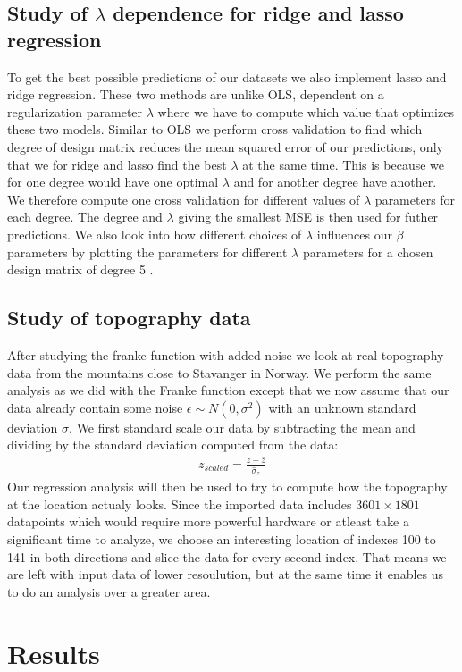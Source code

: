 \documentclass[12pt]{article}
\begin{document}
\subsection{Study of $\lambda$ dependence for ridge and lasso regression}
To get the best possible predictions of our datasets we also implement lasso and ridge regression. These two methods are unlike OLS, dependent on a regularization parameter $\lambda$ where we have to compute which value that optimizes these two models. Similar to OLS we perform cross validation to find which degree of design matrix reduces the mean squared error of our predictions, only that we for ridge and lasso find the best $\lambda$ at the same time. This is because we for one degree would have one optimal $\lambda$ and for another degree have another. We therefore compute one cross validation for different values of $\lambda$ parameters for each degree. The degree and $\lambda$ giving the smallest MSE is then used for futher predictions. We also look into how different choices of $\lambda$ influences our $\beta$ parameters by plotting the parameters for different $\lambda$ parameters for a chosen design matrix of degree 5 .

\subsection{Study of topography data}
After studying the franke function with added noise we look at real topography data from the mountains close to Stavanger in Norway. We perform the same analysis as we did with the Franke function except that we now assume that our data already contain some noise $\epsilon \sim N(0, \sigma^2)$ with an unknown standard deviation $\sigma$. We first standard scale our data by subtracting the mean and dividing by the standard deviation computed from the data:
\begin{align*}
  z_{scaled} = \frac{z-\bar{z}}{\hat{\sigma}_z}
\end{align*}
Our regression analysis will then be used to try to compute how the topography at the location actualy looks. Since the imported data includes  $3601 \times1801$ datapoints which would require more powerful hardware or atleast take a significant time to analyze, we choose an interesting location of indexes 100 to 141 in both directions and slice the data for every second index. That means we are left with input data of lower resoulution, but at the same time it enables us to do an analysis over a greater area.
\section{Results}
\end{document}
